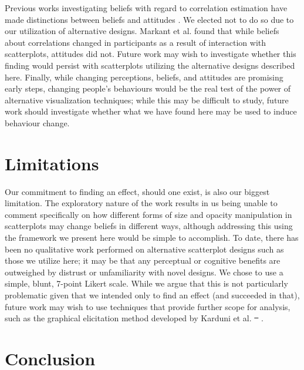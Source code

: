 \documentclass[manuscript,screen,review,anonymous]{acmart}
\providecommand{\DIFaddtex}[1]{{\protect\color{blue}\uwave{#1}}} %
\providecommand{\DIFdeltex}[1]{{\protect\color{red}\sout{#1}}} %
\providecommand{\DIFaddbegin}{} %
\providecommand{\DIFaddend}{} %
\providecommand{\DIFdelbegin}{} %
\providecommand{\DIFdelend}{} %
\providecommand{\DIFadd}[1]{\texorpdfstring{\DIFaddtex{#1}}{#1}} %
\providecommand{\DIFdel}[1]{\texorpdfstring{\DIFdeltex{#1}}{}} %
\newcommand{\DIFscaledelfig}{0.5}
\newlength{\DIFdelgraphicswidth} %
\newlength{\DIFdelgraphicsheight} %
\newcommand{\DIFaddincludegraphics}[2][]{{\color{blue}\fbox{\DIFOincludegraphics[#1]{#2}}}} %
\newcommand{\DIFdelincludegraphics}[2][]{%
\sbox{\DIFdelgraphicsbox}{\DIFOincludegraphics[#1]{#2}}%
\settoboxwidth{\DIFdelgraphicswidth}{\DIFdelgraphicsbox} %
\settoboxtotalheight{\DIFdelgraphicsheight}{\DIFdelgraphicsbox} %
\scalebox{\DIFscaledelfig}{%
\parbox[b]{\DIFdelgraphicswidth}{\usebox{\DIFdelgraphicsbox}\\[-\baselineskip] \rule{\DIFdelgraphicswidth}{0em}}\llap{\resizebox{\DIFdelgraphicswidth}{\DIFdelgraphicsheight}{%
\setlength{\unitlength}{\DIFdelgraphicswidth}%
\begin{picture}(1,1)%
\thicklines\linethickness{2pt} %
{\color[rgb]{1,0,0}\put(0,0){\framebox(1,1){}}}%
{\color[rgb]{1,0,0}\put(0,0){\line( 1,1){1}}}%
{\color[rgb]{1,0,0}\put(0,1){\line(1,-1){1}}}%
\end{picture}%
}\hspace*{3pt}}} %
} %
\DeclareRobustCommand{\DIFaddbegin}{\DIFOaddbegin \let\includegraphics\DIFaddincludegraphics} %
\DeclareRobustCommand{\DIFaddend}{\DIFOaddend \let\includegraphics\DIFOincludegraphics} %
\DeclareRobustCommand{\DIFdelbegin}{\DIFOdelbegin \let\includegraphics\DIFdelincludegraphics} %
\DeclareRobustCommand{\DIFdelend}{\DIFOaddend \let\includegraphics\DIFOincludegraphics} %
\begin{document}
Previous works investigating beliefs with regard to correlation
estimation have made distinctions between beliefs and attitudes
\citep{xiong_2022, markant_2023}. We elected not to do so due to our
utilization of alternative designs. Markant et al. \citep{markant_2023}
found that while beliefs about correlations changed in participants as a
result of interaction with scatterplots, attitudes did not. Future work
may wish to investigate whether this finding would persist with
scatterplots utilizing the alternative designs described here. Finally,
while changing perceptions, beliefs, and attitudes are promising early
steps, changing people's behaviours would be the real test of the power
of alternative visualization techniques; while this may be difficult to
study, future work should investigate whether what we have found here
may be used to induce behaviour change.

\section{Limitations}\label{sec-limitations}

Our commitment to finding an effect, should one exist, is also our
biggest limitation. The exploratory nature of the work results in us
being unable to comment specifically on how different forms of size and
opacity manipulation in scatterplots may change beliefs in different
ways, although addressing this using the framework we present here would
be simple to accomplish. To date, there has been no qualitative work
performed on alternative scatterplot designs such as those we utilize
here; it may be that any perceptual or cognitive benefits are outweighed
by distrust or unfamiliarity with novel designs. We chose to use a
simple, blunt, 7-point Likert scale. While we argue that this is not
particularly problematic given that we intended only to find an effect
(and succeeded in that), future work may wish to use techniques that
provide further scope for analysis, such as the graphical elicitation
method developed by Karduni et al. \DIFdelbegin \DIFdel{\mbox{%
\citep{karduni_2021, karduni_2023}}\hskip0pt%
}\DIFdelend \DIFaddbegin \DIFadd{\mbox{%
\citep{karduni_2020, karduni_2023}}\hskip0pt%
}\DIFaddend .

\section{Conclusion}\label{sec-conclusion}
\end{document}
